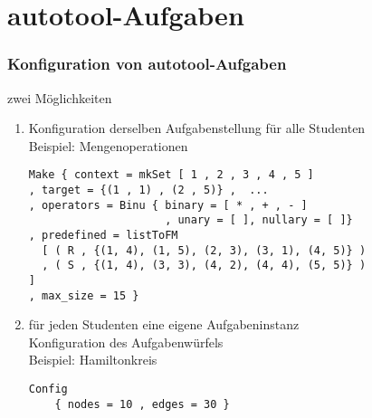 \section{autotool-Aufgaben}
\begin{frame}[fragile]
  \frametitle{Konfiguration von autotool-Aufgaben}
  { \small
    zwei Möglichkeiten
  \begin{enumerate}
  \item Konfiguration derselben Aufgabenstellung für alle Studenten
    \\ Beispiel: Mengenoperationen
\begin{verbatim}
Make { context = mkSet [ 1 , 2 , 3 , 4 , 5 ]
, target = {(1 , 1) , (2 , 5)} ,  ...
, operators = Binu { binary = [ * , + , - ] 
                     , unary = [ ], nullary = [ ]}
, predefined = listToFM
  [ ( R , {(1, 4), (1, 5), (2, 3), (3, 1), (4, 5)} )
  , ( S , {(1, 4), (3, 3), (4, 2), (4, 4), (5, 5)} )                     ]
, max_size = 15 }
\end{verbatim}
\pause
  \item für jeden Studenten eine eigene Aufgabeninstanz
    \\ Konfiguration des Aufgabenwürfels
    \\ Beispiel: Hamiltonkreis
\begin{verbatim}
Config
    { nodes = 10 , edges = 30 }
\end{verbatim}
  \end{enumerate}
}
\end{frame}
